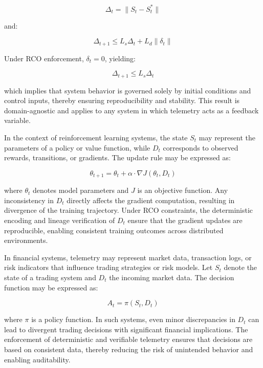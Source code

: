 \begin{equation}
\Delta_t = \|S_t - S_t^*\|
\end{equation}

and:

\begin{equation}
\Delta_{t+1} \leq L_s \Delta_t + L_d \|\delta_t\|
\end{equation}

Under RCO enforcement, $\delta_t = 0$, yielding:

\begin{equation}
\Delta_{t+1} \leq L_s \Delta_t
\end{equation}

which implies that system behavior is governed solely by initial conditions and control inputs, thereby ensuring reproducibility and stability. This result is domain-agnostic and applies to any system in which telemetry acts as a feedback variable.

In the context of reinforcement learning systems, the state $S_t$ may represent the parameters of a policy or value function, while $D_t$ corresponds to observed rewards, transitions, or gradients. The update rule may be expressed as:

\begin{equation}
\theta_{t+1} = \theta_t + \alpha \cdot \nabla J(\theta_t, D_t)
\end{equation}

where $\theta_t$ denotes model parameters and $J$ is an objective function. Any inconsistency in $D_t$ directly affects the gradient computation, resulting in divergence of the training trajectory. Under RCO constraints, the deterministic encoding and lineage verification of $D_t$ ensure that the gradient updates are reproducible, enabling consistent training outcomes across distributed environments.

In financial systems, telemetry may represent market data, transaction logs, or risk indicators that influence trading strategies or risk models. Let $S_t$ denote the state of a trading system and $D_t$ the incoming market data. The decision function may be expressed as:

\begin{equation}
A_t = \pi(S_t, D_t)
\end{equation}

where $\pi$ is a policy function. In such systems, even minor discrepancies in $D_t$ can lead to divergent trading decisions with significant financial implications. The enforcement of deterministic and verifiable telemetry ensures that decisions are based on consistent data, thereby reducing the risk of unintended behavior and enabling auditability.

